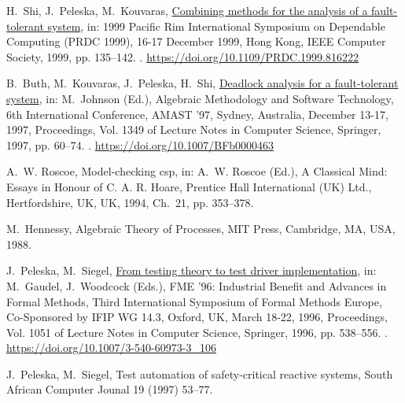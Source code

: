 \documentclass[3p,times]{elsarticle}
\begin{document}
\begin{thebibliography}{10}
H.~Shi, J.~Peleska, M.~Kouvaras,
  \href{https://doi.org/10.1109/PRDC.1999.816222}{Combining methods for the
  analysis of a fault-tolerant system}, in: 1999 Pacific Rim International
  Symposium on Dependable Computing {(PRDC} 1999), 16-17 December 1999, Hong
  Kong, {IEEE} Computer Society, 1999, pp. 135--142.
\newblock \href {http://dx.doi.org/10.1109/PRDC.1999.816222}
  {}.
\newline\urlprefix\url{https://doi.org/10.1109/PRDC.1999.816222}

B.~Buth, M.~Kouvaras, J.~Peleska, H.~Shi,
  \href{https://doi.org/10.1007/BFb0000463}{Deadlock analysis for a
  fault-tolerant system}, in: M.~Johnson (Ed.), Algebraic Methodology and
  Software Technology, 6th International Conference, {AMAST} '97, Sydney,
  Australia, December 13-17, 1997, Proceedings, Vol. 1349 of Lecture Notes in
  Computer Science, Springer, 1997, pp. 60--74.
\newblock \href {http://dx.doi.org/10.1007/BFb0000463}
  {}.
\newline\urlprefix\url{https://doi.org/10.1007/BFb0000463}

A.~W. Roscoe, Model-checking csp, in: A.~W. Roscoe (Ed.), A Classical Mind:
  Essays in Honour of C. A. R. Hoare, Prentice Hall International (UK) Ltd.,
  Hertfordshire, UK, UK, 1994, Ch.~21, pp. 353--378.

M.~Hennessy, Algebraic Theory of Processes, MIT Press, Cambridge, MA, USA,
  1988.

J.~Peleska, M.~Siegel, \href{https://doi.org/10.1007/3-540-60973-3\_106}{From
  testing theory to test driver implementation}, in: M.~Gaudel, J.~Woodcock
  (Eds.), {FME} '96: Industrial Benefit and Advances in Formal Methods, Third
  International Symposium of Formal Methods Europe, Co-Sponsored by {IFIP} {WG}
  14.3, Oxford, UK, March 18-22, 1996, Proceedings, Vol. 1051 of Lecture Notes
  in Computer Science, Springer, 1996, pp. 538--556.
\newblock \href {http://dx.doi.org/10.1007/3-540-60973-3\_106}
  {}.
\newline\urlprefix\url{https://doi.org/10.1007/3-540-60973-3\_106}

J.~Peleska, M.~Siegel, Test automation of safety-critical reactive systems,
  South African Computer Jounal 19 (1997) 53--77.


\end{thebibliography}
\end{document}

